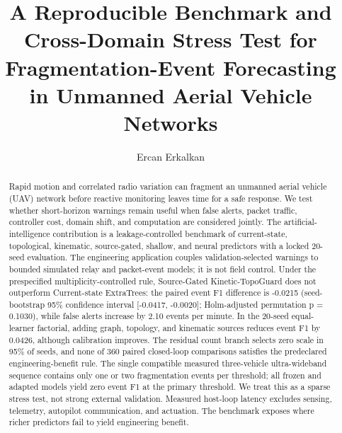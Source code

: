 \documentclass[final,5p,times,twocolumn]{elsarticle}
\newif\ifanonymous
\begin{document}
\begin{frontmatter}

\title{A Reproducible Benchmark and Cross-Domain Stress Test for\\
Fragmentation-Event Forecasting in Unmanned Aerial Vehicle Networks}

\ifanonymous
\author{Anonymous author(s)}
\else
\author[Ercan]{Ercan Erkalkan}
\fi

\begin{abstract}
Rapid motion and correlated radio variation can fragment an unmanned aerial vehicle (UAV)
network before reactive monitoring leaves time for a safe response. We test whether
short-horizon warnings remain useful when false alerts, packet traffic, controller cost,
domain shift, and computation are considered jointly. The artificial-intelligence
contribution is a leakage-controlled benchmark of current-state, topological, kinematic,
source-gated, shallow, and neural predictors with a locked 20-seed evaluation. The
engineering application couples validation-selected warnings to bounded simulated relay
and packet-event models; it is not field control. Under the prespecified
multiplicity-controlled rule, Source-Gated Kinetic-TopoGuard does not outperform
Current-state ExtraTrees: the paired event F1 difference is -0.0215 (seed-bootstrap 95\%
confidence interval [-0.0417, -0.0020]; Holm-adjusted permutation p = 0.1030), while false
alerts increase by 2.10 events per minute. In the 20-seed equal-learner factorial, adding
graph, topology, and kinematic sources reduces event F1 by 0.0426, although calibration
improves. The residual count branch selects zero scale in 95\% of seeds, and none of 360
paired closed-loop comparisons satisfies the predeclared engineering-benefit rule. The
single compatible measured three-vehicle ultra-wideband sequence contains only one or two
fragmentation events per threshold; all frozen and adapted models yield zero event F1 at
the primary threshold. We treat this as a sparse stress test, not strong external
validation. Measured host-loop latency excludes sensing, telemetry, autopilot
communication, and actuation. The benchmark exposes where richer predictors fail to yield
engineering benefit.
\end{abstract}


\end{frontmatter}
\end{document}
